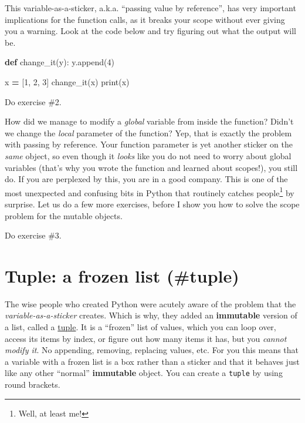 \documentclass[
]{book}
\newenvironment{Shaded}{\begin{snugshade}}{\end{snugshade}}
\newcommand{\BuiltInTok}[1]{#1}
\newcommand{\DecValTok}[1]{\textcolor[rgb]{0.00,0.00,0.81}{#1}}
\newcommand{\KeywordTok}[1]{\textcolor[rgb]{0.13,0.29,0.53}{\textbf{#1}}}
\newcommand{\NormalTok}[1]{#1}
\newcommand{\OperatorTok}[1]{\textcolor[rgb]{0.81,0.36,0.00}{\textbf{#1}}}
\begin{document}
This variable-as-a-sticker, a.k.a. ``passing value by reference'', has very important implications for the function calls, as it breaks your scope without ever giving you a warning. Look at the code below and try figuring out what the output will be.

\begin{Shaded}
\begin{Highlighting}[]
\KeywordTok{def}\NormalTok{ change\_it(y):}
\NormalTok{    y.append(}\DecValTok{4}\NormalTok{)}

\NormalTok{x }\OperatorTok{=}\NormalTok{ [}\DecValTok{1}\NormalTok{, }\DecValTok{2}\NormalTok{, }\DecValTok{3}\NormalTok{]}
\NormalTok{change\_it(x)}
\BuiltInTok{print}\NormalTok{(x)}
\end{Highlighting}
\end{Shaded}

Do exercise \#2.

How did we manage to modify a \emph{global} variable from inside the function? Didn't we change the \emph{local} parameter of the function? Yep, that is exactly the problem with passing by reference. Your function parameter is yet another sticker on the \emph{same} object, so even though it \emph{looks} like you do not need to worry about global variables (that's why you wrote the function and learned about scopes!), you still do. If you are perplexed by this, you are in a good company. This is one of the most unexpected and confusing bits in Python that routinely catches people\footnote{Well, at least me!} by surprise. Let us do a few more exercises, before I show you how to solve the scope problem for the mutable objects.

Do exercise \#3.

\hypertarget{tuple-a-frozen-list-tuple}{%
\section{Tuple: a frozen list (\#tuple)}\label{tuple-a-frozen-list-tuple}}

The wise people who created Python were acutely aware of the problem that the \emph{variable-as-a-sticker} creates. Which is why, they added an \textbf{immutable} version of a list, called a \href{https://docs.python.org/3/library/stdtypes.html?highlight=tuple\#tuple}{tuple}. It is a ``frozen'' list of values, which you can loop over, access its items by index, or figure out how many items it has, but you \emph{cannot modify it}. No appending, removing, replacing values, etc. For you this means that a variable with a frozen list is a box rather than a sticker and that it behaves just like any other ``normal'' \textbf{immutable} object. You can create a \texttt{tuple} by using round brackets.
\end{document}
